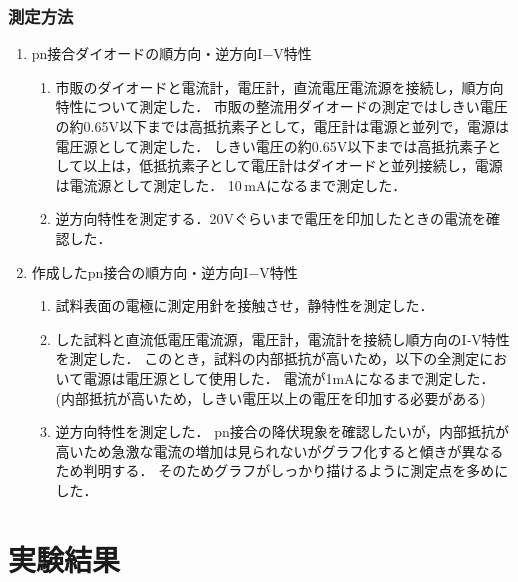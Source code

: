 \documentclass[11pt]{jarticle}
\begin{document}
		\subsubsection{測定方法}
			\begin{enumerate}
				\item pn接合ダイオードの順方向・逆方向I−V特性\\
					\begin{enumerate}
						\item 市販のダイオードと電流計，電圧計，直流電圧電流源を接続し，順方向特性について測定した．
							  市販の整流用ダイオードの測定ではしきい電圧の約0.65V以下までは高抵抗素子として，電圧計は電源と並列で，電源は電圧源として測定した．
							  しきい電圧の約0.65V以下までは高抵抗素子として以上は，低抵抗素子として電圧計はダイオードと並列接続し，電源は電流源として測定した．
							  10\,mAになるまで測定した．
						\item 逆方向特性を測定する．20Vぐらいまで電圧を印加したときの電流を確認した．
					\end{enumerate}
				\item 作成したpn接合の順方向・逆方向I−V特性\\
					\begin{enumerate}
						\item 試料表面の電極に測定用針を接触させ，静特性を測定した．
						\item した試料と直流低電圧電流源，電圧計，電流計を接続し順方向のI‐V特性を測定した．
							  このとき，試料の内部抵抗が高いため，以下の全測定において電源は電圧源として使用した．
							  電流が1mAになるまで測定した．(内部抵抗が高いため，しきい電圧以上の電圧を印加する必要がある)
						\item 逆方向特性を測定した．
							  pn接合の降伏現象を確認したいが，内部抵抗が高いため急激な電流の増加は見られないがグラフ化すると傾きが異なるため判明する．
							  そのためグラフがしっかり描けるように測定点を多めにした．
					\end{enumerate}
			\end{enumerate}
\clearpage
\section{実験結果}
\end{document}
